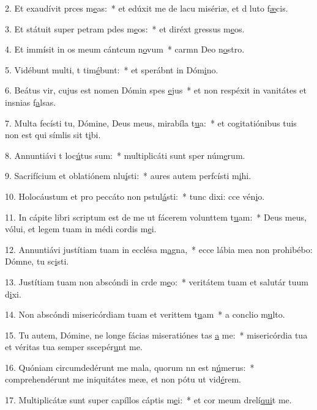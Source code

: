 2. Et exaudívit prces m\uline{e}as:~* et edúxit me de lacu misériæ, et d luto f\uline{æ}cis.\par 
3. Et státuit super petram pdes m\uline{e}os:~* et diréxt gressus m\uline{e}os.\par 
4. Et immísit in os meum cántcum n\uline{o}vum~* carmn Deo n\uline{o}stro.\par 
5. Vidébunt multi, t tim\uline{é}bunt:~* et sperábnt in Dóm\uline{i}no.\par 
6. Beátus vir, cujus est nomen Dómin spes \uline{e}jus~* et non respéxit in vanitátes et insnias f\uline{a}lsas.\par 
7. Multa fecísti tu, Dómine, Deus meus, mirabíla t\uline{u}a:~* et cogitatiónibus tuis non est qui símlis sit t\uline{i}bi.\par 
8. Annuntiávi t loc\uline{ú}tus sum:~* multiplicáti sunt sper núm\uline{e}rum.\par 
9. Sacrifícium et oblatiónem nlu\uline{í}sti:~* aures autem perfcísti m\uline{i}hi.\par 
10. Holocáustum et pro peccáto non pstul\uline{á}sti:~* tunc dixi: cce vén\uline{i}o.\par 
11. In cápite libri scriptum est de me ut fácerem volunttem t\uline{u}am:~* Deus meus, vólui, et legem tuam in médi cordis m\uline{e}i.\par 
12. Annuntiávi justítiam tuam in ecclésa m\uline{a}gna,~* ecce lábia mea non prohibébo: Dómne, tu sc\uline{i}sti.\par 
13. Justítiam tuam non abscóndi in crde m\uline{e}o:~* veritátem tuam et salutár tuum d\uline{i}xi.\par 
14. Non abscóndi misericórdiam tuam et verittem t\uline{u}am~* a conclio m\uline{u}lto.\par 
15. Tu autem, Dómine, ne longe fácias miseratiónes tas \uline{a} me:~* misericórdia tua et véritas tua semper sscepér\uline{u}nt me.\par 
16. Quóniam circumdedérunt me mala, quorum nn est n\uline{ú}merus:~* comprehendérunt me iniquitátes meæ, et non pótu ut vid\uline{é}rem.\par 
17. Multiplicátæ sunt super capíllos cáptis m\uline{e}i:~* et cor meum drelí\uline{qui}t me.\par 
